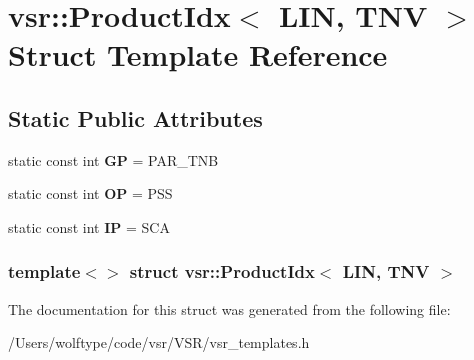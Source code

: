 \hypertarget{structvsr_1_1_product_idx_3_01_l_i_n_00_01_t_n_v_01_4}{\section{vsr\-:\-:Product\-Idx$<$ L\-I\-N, T\-N\-V $>$ Struct Template Reference}
\label{structvsr_1_1_product_idx_3_01_l_i_n_00_01_t_n_v_01_4}
}
\subsection*{Static Public Attributes}
\begin{DoxyCompactItemize}
\item 
\hypertarget{structvsr_1_1_product_idx_3_01_l_i_n_00_01_t_n_v_01_4_ad030cf50d1fb502bf643a30e9307b2bc}{static const int {\bfseries G\-P} = P\-A\-R\-\_\-\-T\-N\-B}\label{structvsr_1_1_product_idx_3_01_l_i_n_00_01_t_n_v_01_4_ad030cf50d1fb502bf643a30e9307b2bc}

\item 
\hypertarget{structvsr_1_1_product_idx_3_01_l_i_n_00_01_t_n_v_01_4_a0e4a8e4f98cc71da5f438914e8a5ccc8}{static const int {\bfseries O\-P} = P\-S\-S}\label{structvsr_1_1_product_idx_3_01_l_i_n_00_01_t_n_v_01_4_a0e4a8e4f98cc71da5f438914e8a5ccc8}

\item 
\hypertarget{structvsr_1_1_product_idx_3_01_l_i_n_00_01_t_n_v_01_4_a6853e3dad5c8085fd590d6cc12a8c0ae}{static const int {\bfseries I\-P} = S\-C\-A}\label{structvsr_1_1_product_idx_3_01_l_i_n_00_01_t_n_v_01_4_a6853e3dad5c8085fd590d6cc12a8c0ae}

\end{DoxyCompactItemize}
\subsubsection*{template$<$$>$ struct vsr\-::\-Product\-Idx$<$ L\-I\-N, T\-N\-V $>$}



The documentation for this struct was generated from the following file\-:\begin{DoxyCompactItemize}
\item 
/\-Users/wolftype/code/vsr/\-V\-S\-R/vsr\-\_\-templates.\-h\end{DoxyCompactItemize}
